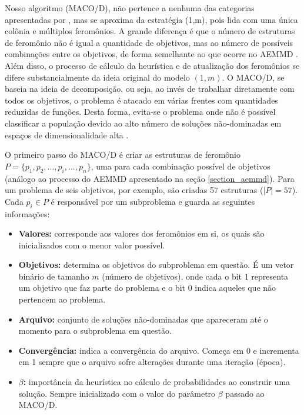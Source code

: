 Nosso algoritmo (MACO/D), não pertence a nenhuma das categorias apresentadas por \cite{Alaya2007}, mas se aproxima da estratégia (1,m), pois lida com uma única colônia e múltiplos feromônios. A grande diferença é que o número de estruturas de feromônio não é igual a quantidade de objetivos, mas ao número de possíveis combinações entre os objetivos, de forma semelhante ao que ocorre no AEMMD \cite{Lafeta2017}. Além disso, o processo de cálculo da heurística e de atualização dos feromônios se difere substancialmente da ideia original do modelo $(1,m)$. O MACO/D, se baseia na ideia de decomposição, ou seja, ao invés de trabalhar diretamente com todos os objetivos, o problema é atacado em várias frentes com quantidades reduzidas de funções. Desta forma, evita-se o problema onde não é possível classificar a população devido ao alto número de soluções não-dominadas em espaços de dimensionalidade alta \cite{Deb2014}.

O primeiro passo do MACO/D é criar as estruturas de feromônio $P = \{p_1, p_2, ..., p_i, ..., p_n\}$, uma para cada combinação possível de objetivos (análogo ao processo do AEMMD apresentado na seção \ref{section_aemmd}). Para um problema de seis objetivos, por exemplo, são criadas 57 estruturas ($|P| = 57$). Cada $p_i \in P$ é responsável por um subproblema e guarda as seguintes informações:

\begin{itemize}
	\item \textbf{Valores:} corresponde aos valores dos feromônios em si, os quais são inicializados com o menor valor possível.
	\item \textbf{Objetivos:} determina os objetivos do subproblema em questão. É um vetor binário de tamanho $m$ (número de objetivos), onde cada o bit 1 representa um objetivo que faz parte do problema e o bit 0 indica aqueles que não pertencem ao problema.
	\item \textbf{Arquivo:} conjunto de soluções não-dominadas que apareceram até o momento para o subproblema em questão.
	\item \textbf{Convergência:} indica a convergência do arquivo. Começa em 0 e incrementa em 1 sempre que o arquivo sofre alterações durante uma iteração (época).
	\item \textbf{$\beta$:} importância da heurística no cálculo de probabilidades ao construir uma solução. Sempre inicializado com o valor do parâmetro $\beta$ passado ao MACO/D.
\end{itemize}

